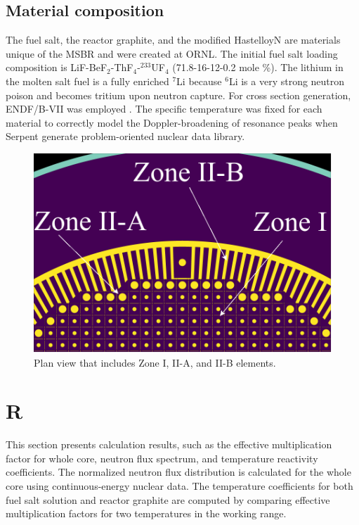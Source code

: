\documentclass{anstrans}
\begin{document}
\subsection{Material composition}
The fuel salt, the reactor graphite, and the modified HastelloyN are materials 
unique of the \gls{MSBR} and were created at \gls{ORNL}. The initial fuel salt 
loading composition is LiF-BeF$_2$-ThF$_4$-$^{233}$UF$_4$ (71.8-16-12-0.2 mole 
\%). The lithium in the molten salt fuel is a fully enriched $^{7}$Li because 
$^{6}$Li is a very strong neutron poison and becomes tritium upon neutron 
capture. For cross section generation, ENDF/B-VII was employed \cite{chadwick_endf/b-vii.0:_2006}. The specific temperature was fixed for each material to correctly model the Doppler-broadening of resonance peaks when Serpent generate problem-oriented nuclear data library.
\begin{figure}[htbp!] %
  \centering
  \includegraphics[width=0.96\linewidth]{figure_2_5.png}
  \caption{Plan view that includes Zone I, II-A, and II-B elements.}
  \label{fig:zone2B}
\end{figure}
\FloatBarrier
\section{R}
This section presents calculation results, such as the effective multiplication 
factor for whole core, neutron flux spectrum, and temperature reactivity 
coefficients. The normalized neutron flux distribution is calculated for the 
whole core using continuous-energy nuclear data.
The temperature coefficients for both fuel salt solution and reactor graphite are computed by comparing effective multiplication factors for two temperatures in the working range.
 	
\end{document}
